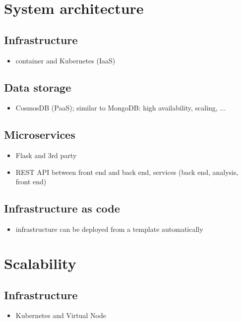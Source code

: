 \documentclass[conference]{IEEEtran}
\begin{document}
\section{System architecture}
\subsection{Infrastructure}
\begin{itemize}
	\item container and Kubernetes (IaaS)
\end{itemize}

\subsection{Data storage}
\begin{itemize}
	\item CosmosDB (PaaS); similar to MongoDB: high availability, scaling, ...
\end{itemize}

\subsection{Microservices}
\begin{itemize}
	\item Flask and 3rd party
	\item REST API between front end and back end,  services (back end, analysis, front end)
\end{itemize}

\subsection{Infrastructure as code}
\begin{itemize}
	\item infrastructure can be deployed from a template automatically
\end{itemize}

\section{Scalability}
\subsection{Infrastructure}
\begin{itemize}
	\item Kubernetes and Virtual Node
\end{itemize}
\end{document}
